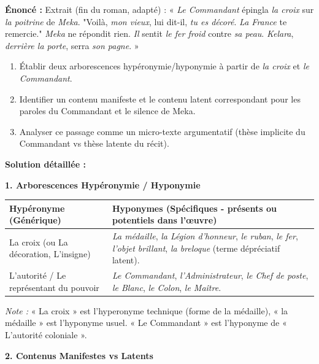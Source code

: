 \documentclass[11pt]{article}
\newcommand{\cle}[1]{{\popxbold\color{popdark}#1}}
\begin{document}
\begin{exoresolu}
\textbf{Énoncé :} Extrait (fin du roman, adapté) : « \emph{Le Commandant} épingla \emph{la croix} sur \emph{la poitrine} de \emph{Meka}. "Voilà, \emph{mon vieux}, lui dit-il, \emph{tu es décoré}. \emph{La France} te remercie." \emph{Meka} ne répondit rien. \emph{Il} sentit \emph{le fer froid} contre \emph{sa peau}. \emph{Kelara}, \emph{derrière la porte}, serra \emph{son pagne}. »
\begin{enumerate}
    \item Établir deux arborescences hypéronymie/hyponymie à partir de \emph{la croix} et \emph{le Commandant}.
    \item Identifier un contenu manifeste et le contenu latent correspondant pour les paroles du Commandant et le silence de Meka.
    \item Analyser ce passage comme un micro-texte argumentatif (thèse implicite du Commandant vs thèse latente du récit).
\end{enumerate}
\tcblower
\textbf{Solution détaillée :}

\textbf{1. Arborescences Hypéronymie / Hyponymie}

\begin{center}
\begin{tabularx}{\linewidth}{|l|X|}\hline
\textbf{Hypéronyme (Générique)} & \textbf{Hyponymes (Spécifiques - présents ou potentiels dans l'œuvre)} \\ \hline
\cle{La croix} (ou \cle{La décoration}, \cle{L'insigne}) & \emph{La médaille}, \emph{la Légion d'honneur}, \emph{le ruban}, \emph{le fer}, \emph{l'objet brillant}, \emph{la breloque} (terme dépréciatif latent). \\ \hline
\cle{L'autorité} / \cle{Le représentant du pouvoir} & \emph{Le Commandant}, \emph{l'Administrateur}, \emph{le Chef de poste}, \emph{le Blanc}, \emph{le Colon}, \emph{le Maître}. \\ \hline
\end{tabularx}
\end{center}
\textit{Note :} « La croix » est l'hyperonyme technique (forme de la médaille), « la médaille » est l'hyponyme usuel. « Le Commandant » est l'hyponyme de « L'autorité coloniale ».

\textbf{2. Contenus Manifestes vs Latents}


\end{exoresolu}
\end{document}
